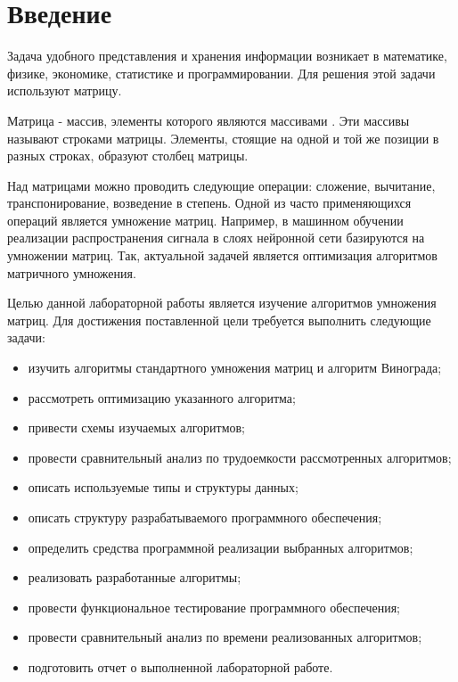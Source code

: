 \chapter*{Введение}

Задача удобного представления и хранения информации возникает в математике, физике, экономике, статистике и программировании. Для решения этой задачи используют матрицу.

Матрица - массив, элементы которого являются массивами \cite{virt}. Эти массивы называют строками матрицы. Элементы, стоящие на одной и той же позиции в разных строках, образуют столбец матрицы.

Над матрицами можно проводить следующие операции: сложение, вычитание, транспонирование, возведение в степень. Одной из часто применяющихся операций является умножение матриц. Например, в машинном обучении реализации распространения сигнала в слоях нейронной сети базируются на умножении матриц. Так, актуальной задачей является оптимизация алгоритмов матричного умножения.

Целью данной лабораторной работы является изучение алгоритмов умножения матриц. Для достижения поставленной цели требуется выполнить следующие задачи:

\begin{itemize}
	\item изучить алгоритмы стандартного умножения матриц и алгоритм Винограда;
	\item рассмотреть оптимизацию указанного алгоритма;
	\item привести схемы изучаемых алгоритмов;
	\item провести сравнительный анализ по трудоемкости рассмотренных алгоритмов;
	\item описать используемые типы и структуры данных;
	\item описать структуру разрабатываемого программного обеспечения;
	\item определить средства программной реализации выбранных алгоритмов;
	\item реализовать разработанные алгоритмы;
	\item провести функциональное тестирование программного обеспечения;
	\item провести сравнительный анализ по времени реализованных алгоритмов;
	\item подготовить отчет о выполненной лабораторной работе.
\end{itemize}